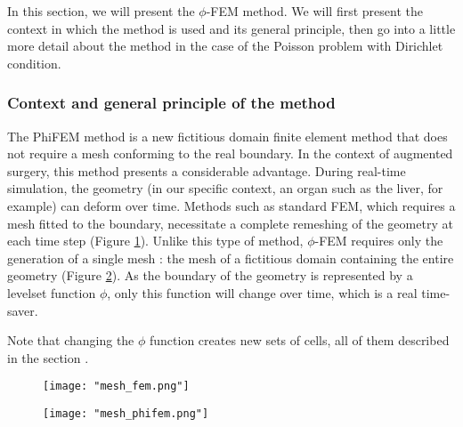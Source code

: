 In this section, we will present the $\phi$-FEM method. We will first present the context in which the method is used and its general principle, then go into a little more detail about the method in the case of the Poisson problem with Dirichlet condition. 

\subsubsection{Context and general principle of the method}

The PhiFEM method is a new fictitious domain finite element method that does not require a mesh conforming to the real boundary. In the context of augmented surgery, this method presents a considerable advantage. During real-time simulation, the geometry (in our specific context, an organ such as the liver, for example) can deform over time. Methods such as standard FEM, which requires a mesh fitted to the boundary, necessitate a complete remeshing of the geometry at each time step (Figure \ref{mesh_fem}). Unlike this type of method, $\phi$-FEM requires only the generation of a single mesh : the mesh of a fictitious domain containing the entire geometry (Figure \ref{mesh_phifem}). As the boundary of the geometry is represented by a levelset function $\phi$, only this function will change over time, which is a real time-saver.

\begin{Rem}
	Note that changing the $\phi$ function creates new sets of cells, all of them described in the section .
\end{Rem}

\begin{minipage}{0.52\linewidth}
	\begin{figure}[H]
		\centering
		\texttt{[image: "mesh\_fem.png"]}
		\label{mesh_fem}
	\end{figure}
\end{minipage} \;
\begin{minipage}{0.44\linewidth}
	\begin{figure}[H]
		\centering
		\texttt{[image: "mesh\_phifem.png"]}
		\label{mesh_phifem}
	\end{figure}
\end{minipage}

